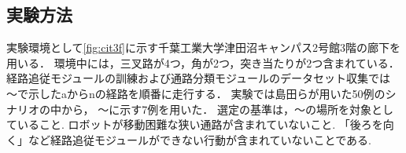 \subsection{実験方法}
実験環境として\ref{fig:cit3f}に示す千葉工業大学津田沼キャンパス2号館3階の廊下を用いる．
環境中には，三叉路が4つ，角が2つ，突き当たりが2つ含まれている．
経路追従モジュールの訓練および通路分類モジュールのデータセット収集では
〜で示したaからnの経路を順番に走行する．
実験では島田らが用いた50例のシナリオの中から，
〜に示す7例を用いた．
選定の基準は，〜の場所を対象としていること.
ロボットが移動困難な狭い通路が含まれていないこと.
「後ろを向く」など経路追従モジュールができない行動が含まれていないことである.
